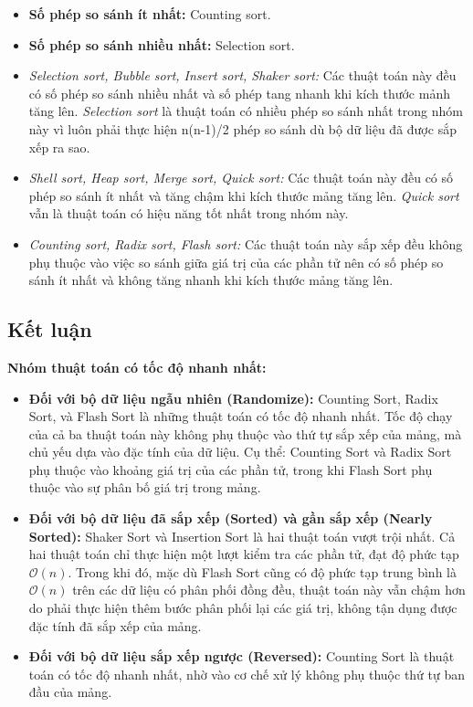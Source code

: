     \begin{itemize}
        \item \textbf{Số phép so sánh ít nhất:} Counting sort.
        \item \textbf{Số phép so sánh nhiều nhất:} Selection sort.
        \item \textit{Selection sort, Bubble sort, Insert sort, Shaker sort:} Các thuật toán này đều có số phép so sánh nhiều nhất và số phép tang nhanh khi kích thước mảnh tăng lên. \textit{Selection sort} là thuật toán có nhiều phép so sánh nhất trong nhóm này vì luôn phải thực hiện n(n-1)/2 phép so sánh dù bộ dữ liệu đã được sắp xếp ra sao.
        \item \textit{Shell sort, Heap sort, Merge sort, Quick sort:} Các thuật toán này đều có số phép so sánh ít nhất và tăng chậm khi kích thước mảng tăng lên. \textit{Quick sort} vẫn là thuật toán có hiệu năng tốt nhất trong nhóm này.
        \item \textit{Counting sort, Radix sort, Flash sort:} Các thuật toán này sắp xếp đều không phụ thuộc vào việc so sánh giữa giá trị của các phần tử nên có số phép so sánh ít nhất và không tăng nhanh khi kích thước mảng tăng lên.
    \end{itemize}



\newpage
\subsection{Kết luận}

\textbf{Nhóm thuật toán có tốc độ nhanh nhất:}

\begin{itemize}
    \item \textbf{Đối với bộ dữ liệu ngẫu nhiên (Randomize):} Counting Sort, Radix Sort, và Flash Sort là những thuật toán có tốc độ nhanh nhất. Tốc độ chạy của cả ba thuật toán này không phụ thuộc vào thứ tự sắp xếp của mảng, mà chủ yếu dựa vào đặc tính của dữ liệu. Cụ thể: Counting Sort và Radix Sort phụ thuộc vào khoảng giá trị của các phần tử, trong khi Flash Sort phụ thuộc vào sự phân bố giá trị trong mảng.
    
    \item \textbf{Đối với bộ dữ liệu đã sắp xếp (Sorted) và gần sắp xếp (Nearly Sorted):} Shaker Sort và Insertion Sort là hai thuật toán vượt trội nhất. Cả hai thuật toán chỉ thực hiện một lượt kiểm tra các phần tử, đạt độ phức tạp $\mathcal{O}(n)$. Trong khi đó, mặc dù Flash Sort cũng có độ phức tạp trung bình là $\mathcal{O}(n)$ trên các dữ liệu có phân phối đồng đều, thuật toán này vẫn chậm hơn do phải thực hiện thêm bước phân phối lại các giá trị, không tận dụng được đặc tính đã sắp xếp của mảng.
    
    \item \textbf{Đối với bộ dữ liệu sắp xếp ngược (Reversed):} Counting Sort là thuật toán có tốc độ nhanh nhất, nhờ vào cơ chế xử lý không phụ thuộc thứ tự ban đầu của mảng.
\end{itemize}

